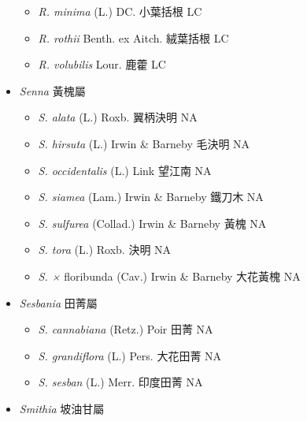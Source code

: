 \begin{itemize}
  \begin{itemize}
        \item[] \textit{R. minima} (L.) DC.  小葉括根   LC
        \item[] \textit{R. rothii} Benth. ex Aitch.  絨葉括根   LC
        \item[] \textit{R. volubilis} Lour.  鹿藿   LC
  \end{itemize}
 \item[] \textit{Senna} 黃槐屬
                                
  \begin{itemize}
        \item[] \textit{S. alata} (L.) Roxb.  翼柄決明   NA
        \item[] \textit{S. hirsuta} (L.) Irwin \& Barneby  毛決明   NA
        \item[] \textit{S. occidentalis} (L.) Link  望江南   NA
        \item[] \textit{S. siamea} (Lam.) Irwin \& Barneby  鐵刀木   NA
        \item[] \textit{S. sulfurea} (Collad.) Irwin \& Barneby  黃槐   NA
        \item[] \textit{S. tora} (L.) Roxb.  決明   NA
        \item[] \textit{S. ×} floribunda \textit{} (Cav.) Irwin \& Barneby  大花黃槐   NA
  \end{itemize}
 \item[] \textit{Sesbania} 田菁屬
                                
  \begin{itemize}
        \item[] \textit{S. cannabiana} (Retz.) Poir  田菁   NA
        \item[] \textit{S. grandiflora} (L.) Pers.  大花田菁   NA
        \item[] \textit{S. sesban} (L.) Merr.  印度田菁   NA
  \end{itemize}
 \item[] \textit{Smithia} 坡油甘屬
                                

\end{itemize}
